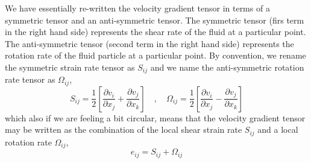 We have essentially re-written the velocity gradient tensor in terms of a symmetric tensor and an anti-symmetric tensor. 
The symmetric tensor (firs term in the right hand side) represents the shear rate of the fluid at a particular point.
The anti-symmetric tensor (second term in the right hand side) represents the rotation rate of the fluid particle at a particular point.
By convention, we rename the symmetric strain rate tensor as $S_{ij}$ and we name the anti-symmetric rotation rate tensor as $\Omega_{ij}$,
$$S_{ij} = \frac{1}{2}\left[\frac{\partial v_{i}}{\partial x_{j}} + \frac{\partial v_{j}}{\partial x_{k}}\right] \quad,\quad \Omega_{ij} = \frac{1}{2}\left[\frac{\partial v_{i}}{\partial x_{j}} - \frac{\partial v_{j}}{\partial x_{k}}\right]$$
which also if we are feeling a bit circular, means that the velocity gradient tensor may be written as the combination of the local shear strain rate $S_{ij}$ and a local rotation rate $\Omega_{ij}$,
$$e_{ij} = S_{ij} + \Omega_{ij}$$


